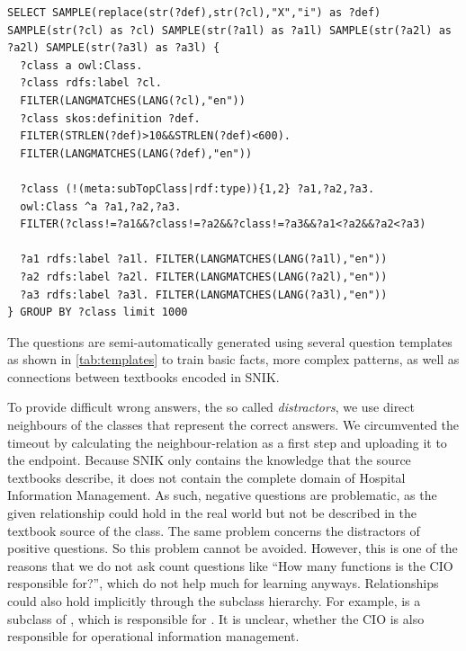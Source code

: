 \documentclass{IOS-Book-Article}     %
\begin{document}
\begin{lstlisting}[captionpos=b, caption=SPARQL query generating the key and distractors for the \emph{definition} questions., label=lst:sparql,basicstyle=\ttfamily\footnotesize,frame=single]
SELECT SAMPLE(replace(str(?def),str(?cl),"X","i") as ?def) SAMPLE(str(?cl) as ?cl) SAMPLE(str(?a1l) as ?a1l) SAMPLE(str(?a2l) as ?a2l) SAMPLE(str(?a3l) as ?a3l) {
  ?class a owl:Class.
  ?class rdfs:label ?cl.
  FILTER(LANGMATCHES(LANG(?cl),"en"))
  ?class skos:definition ?def.
  FILTER(STRLEN(?def)>10&&STRLEN(?def)<600).
  FILTER(LANGMATCHES(LANG(?def),"en"))
  
  ?class (!(meta:subTopClass|rdf:type)){1,2} ?a1,?a2,?a3.
  owl:Class ^a ?a1,?a2,?a3.
  FILTER(?class!=?a1&&?class!=?a2&&?class!=?a3&&?a1<?a2&&?a2<?a3)

  ?a1 rdfs:label ?a1l. FILTER(LANGMATCHES(LANG(?a1l),"en"))
  ?a2 rdfs:label ?a2l. FILTER(LANGMATCHES(LANG(?a2l),"en"))
  ?a3 rdfs:label ?a3l. FILTER(LANGMATCHES(LANG(?a3l),"en"))
} GROUP BY ?class limit 1000
\end{lstlisting}
%
The questions are semi-automatically generated using several question templates as shown in \cref{tab:templates} to train basic facts, more complex patterns, as well as connections between textbooks encoded in SNIK.

To provide difficult wrong answers, the so called \emph{distractors}, we use direct neighbours of the classes that represent the correct answers.
We circumvented the timeout by calculating the neighbour-relation as a first step and uploading it to the endpoint.
%
Because SNIK only contains the knowledge that the source textbooks describe, it does not contain the complete domain of Hospital Information Management.
As such, negative questions are problematic, as the given relationship could hold in the real world but not be described in the textbook source of the class.
The same problem concerns the distractors of positive questions.
So this problem cannot be avoided.
However, this is one of the reasons that we do not ask count questions like \enquote{How many functions is the CIO responsible for?}, which do not help much for learning anyways. %
Relationships could also hold implicitly through the subclass hierarchy.
For example,  is a subclass of , which is responsible for .
It is unclear, whether the CIO is also responsible for operational information management.
\end{document}
